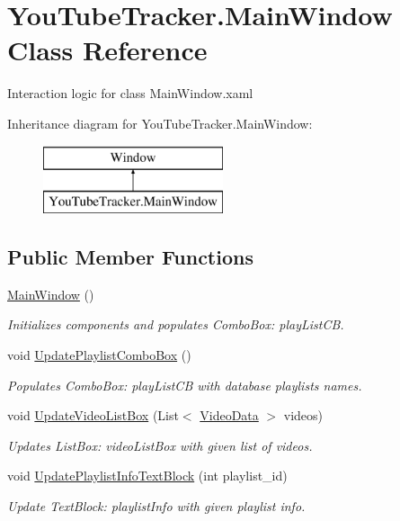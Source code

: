 \hypertarget{class_you_tube_tracker_1_1_main_window}{}\section{You\+Tube\+Tracker.\+Main\+Window Class Reference}
\label{class_you_tube_tracker_1_1_main_window}


Interaction logic for class Main\+Window.\+xaml  


Inheritance diagram for You\+Tube\+Tracker.\+Main\+Window\+:\begin{figure}[H]
\begin{center}
\leavevmode
\includegraphics[height=2.000000cm]{class_you_tube_tracker_1_1_main_window}
\end{center}
\end{figure}
\subsection*{Public Member Functions}
\begin{DoxyCompactItemize}
\item 
\mbox{\hyperlink{class_you_tube_tracker_1_1_main_window_a1e4be9d4abe38411826ace3c9c9b6b06}{Main\+Window}} ()
\begin{DoxyCompactList}\small\item\em Initializes components and populates Combo\+Box\+: {\ttfamily play\+List\+CB}. \end{DoxyCompactList}\item 
void \mbox{\hyperlink{class_you_tube_tracker_1_1_main_window_aa1784f0a72b941e073f753939c5f89d5}{Update\+Playlist\+Combo\+Box}} ()
\begin{DoxyCompactList}\small\item\em Populates Combo\+Box\+: {\ttfamily play\+List\+CB} with database playlists\textquotesingle{} names. \end{DoxyCompactList}\item 
void \mbox{\hyperlink{class_you_tube_tracker_1_1_main_window_ae42b5a4f3b7d6e720ef2825f6786512d}{Update\+Video\+List\+Box}} (List$<$ \mbox{\hyperlink{struct_you_tube_tracker_1_1_video_data}{Video\+Data}} $>$ videos)
\begin{DoxyCompactList}\small\item\em Updates List\+Box\+: {\ttfamily video\+List\+Box} with given list of videos. \end{DoxyCompactList}\item 
void \mbox{\hyperlink{class_you_tube_tracker_1_1_main_window_a0f16b6bca0c659f84e23615a938fc3b5}{Update\+Playlist\+Info\+Text\+Block}} (int playlist\+\_\+id)
\begin{DoxyCompactList}\small\item\em Update Text\+Block\+: {\ttfamily playlist\+Info} with given playlist info. \end{DoxyCompactList}\end{DoxyCompactItemize}


